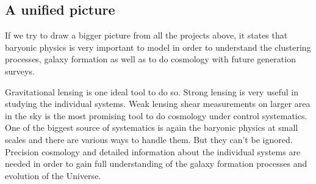 \subsection{A unified picture}

If we try to draw a bigger picture from all the projects above, it states that
baryonic physics is very important to model in order to understand the clustering processes,
galaxy formation as well as to do cosmology with future generation surveys. 

Gravitational lensing is one ideal tool to do so. Strong lensing
is very useful in studying the individual systems. 
Weak lensing shear measurements
on larger area in the sky is the most promising tool to do cosmology under
control systematics. One of the biggest source of systematics is again the 
baryonic physics at small scales and there are various ways to handle them. But
they can't be ignored. Precision cosmology and detailed information about the 
individual systems are needed in order to gain full understanding of the 
galaxy formation processes and evolution of the Universe. 












